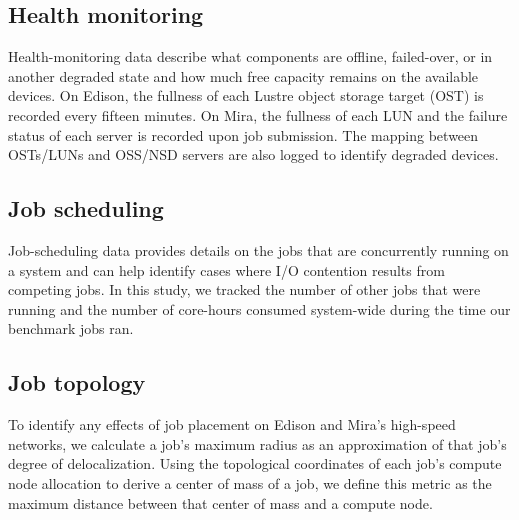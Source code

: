 \subsection{Health monitoring} \label{sec:methods/health}

Health-monitoring data describe what components are offline, failed-over, or in another degraded state and how much free capacity remains on the available devices.
On Edison, the fullness of each Lustre object storage target (OST) is recorded every fifteen minutes.  
On Mira, the fullness of each LUN and the failure status of each server is recorded upon job submission.
The mapping between OSTs/LUNs and OSS/NSD servers are also logged to identify degraded devices.

\subsection{Job scheduling} \label{sec:methods/scheduling}

Job-scheduling data provides details on the jobs that are concurrently running on a system and can help identify cases where I/O contention results from competing jobs.
In this study, we tracked the number of other jobs that were running and the number of core-hours consumed system-wide during the time our benchmark jobs ran.


\subsection{Job topology} \label{sec:methods/other}

To identify any effects of job placement on Edison and Mira's high-speed networks, we calculate a job's maximum radius as an approximation of that job's degree of delocalization.
Using the topological coordinates of each job's compute node allocation to derive a center of mass of a job, we define this metric as the maximum distance between that center of mass and a compute node.


